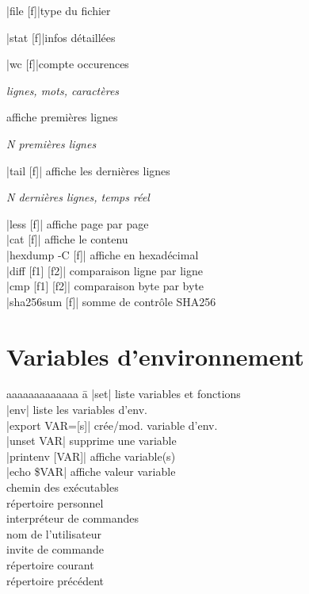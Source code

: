 \documentclass{article}
\newenvironment{cmdblock}{%
  \par\setlength{\parindent}{0pt}\setlength{\parskip}{0pt}%
  \RaggedRight%
}{\par}
\newlength{\cmdoptindent}
\newcommand{\cmdopt}[1]{%
  \hspace*{\cmdoptindent}%
  \begin{minipage}[t]{\dimexpr\linewidth-\cmdoptindent\relax}
    \RaggedRight \itshape #1%
  \end{minipage}\par
}
\begin{document}
\begin{multicols}{4}
    \begin{cmdblock}
        \code|file [f]|\quad type du fichier\par
        \code|stat [f]|\quad infos détaillées\par
        \code|wc [f]|\quad compte occurences\par
        \cmdopt{ lignes,  mots,  caractères}
        \quad affiche premières lignes\par
        \cmdopt{ N premières lignes}
        \code|tail [f]| \quad affiche les dernières lignes \\
        \cmdopt{ N dernières lignes,
             temps réel}
        \code|less [f]| \quad affiche page par page \\
        \code|cat [f]| \quad affiche le contenu \\
        \code|hexdump -C [f]| \quad affiche en hexadécimal \\
        \code|diff [f1] [f2]| \quad comparaison ligne par ligne \\
        \code|cmp [f1] [f2]| \quad comparaison byte par byte \\
        \code|sha256sum [f]| \quad somme de contrôle SHA256 \\
    \end{cmdblock}

    \section*{Variables d'environnement}
    \begin{tabbing}
        aaaaaaaaaaaaa \= a \kill
        \code|set| \> liste variables et fonctions \\
        \code|env| \> liste les variables d'env. \\
        \code|export VAR=[s]| \> crée/mod. variable d'env. \\
        \code|unset VAR| \> supprime une variable \\
        \code|printenv [VAR]| \> affiche variable(s) \\
        \code|echo \$VAR| \> affiche valeur variable \\
         \> chemin des exécutables \\
         \> répertoire personnel \\
         \> interpréteur de commandes \\
         \> nom de l'utilisateur \\
         \> invite de commande \\
         \> répertoire courant \\
         \> répertoire précédent \\
    \end{tabbing}


\end{multicols}
\end{document}
